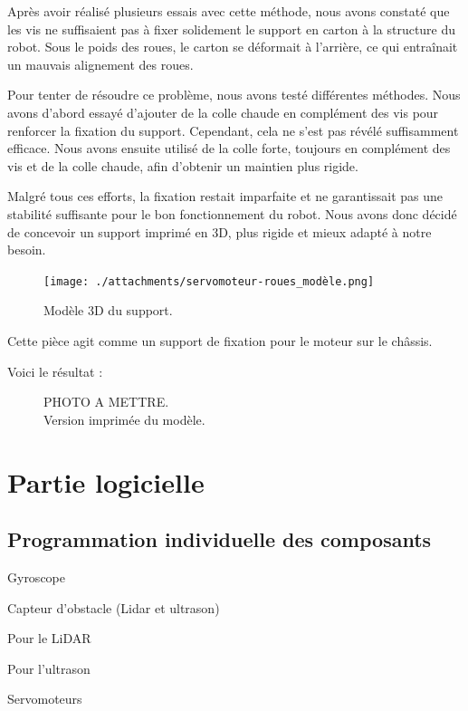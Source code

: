 \documentclass[a4paper,12pt]{report}  %
\begin{document}
Après avoir réalisé plusieurs essais avec cette méthode, nous avons constaté que les vis ne suffisaient pas à fixer solidement le support en carton à la structure du robot. Sous le poids des roues, le carton se déformait à l’arrière, ce qui entraînait un mauvais alignement des roues.

Pour tenter de résoudre ce problème, nous avons testé différentes méthodes. Nous avons d’abord essayé d’ajouter de la colle chaude en complément des vis pour renforcer la fixation du support. Cependant, cela ne s’est pas révélé suffisamment efficace. Nous avons ensuite utilisé de la colle forte, toujours en complément des vis et de la colle chaude, afin d’obtenir un maintien plus rigide.

Malgré tous ces efforts, la fixation restait imparfaite et ne garantissait pas une stabilité suffisante pour le bon fonctionnement du robot. Nous avons donc décidé de concevoir un support imprimé en 3D, plus rigide et mieux adapté à notre besoin.

\begin{figure}[H]
	\centering
	\texttt{[image: ./attachments/servomoteur-roues\_modèle.png]}
	\caption{Modèle 3D du support.}
\end{figure}

Cette pièce agit comme un support de fixation pour le moteur sur le châssis.

Voici le résultat : 

\begin{figure}[H]
	\centering
	\caption{PHOTO A METTRE. \\ Version imprimée du modèle.}
\end{figure}

\section{Partie logicielle}
\subsection{Programmation individuelle des composants}

Gyroscope

Capteur d’obstacle (Lidar et ultrason)

Pour le LiDAR

Pour l’ultrason

Servomoteurs
\end{document}
